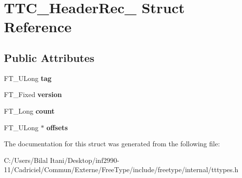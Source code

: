 \hypertarget{struct_t_t_c___header_rec__}{}\section{T\+T\+C\+\_\+\+Header\+Rec\+\_\+ Struct Reference}
\label{struct_t_t_c___header_rec__}
\subsection*{Public Attributes}
\begin{DoxyCompactItemize}
\item 
F\+T\+\_\+\+U\+Long {\bfseries tag}\hypertarget{struct_t_t_c___header_rec___a7fc09906e402f8937b6ca207c84453b4}{}\label{struct_t_t_c___header_rec___a7fc09906e402f8937b6ca207c84453b4}

\item 
F\+T\+\_\+\+Fixed {\bfseries version}\hypertarget{struct_t_t_c___header_rec___aa9ecb33279c68c3c00c1232441da5801}{}\label{struct_t_t_c___header_rec___aa9ecb33279c68c3c00c1232441da5801}

\item 
F\+T\+\_\+\+Long {\bfseries count}\hypertarget{struct_t_t_c___header_rec___a0bf5898e9d8c55bc74f51712a5ad1b58}{}\label{struct_t_t_c___header_rec___a0bf5898e9d8c55bc74f51712a5ad1b58}

\item 
F\+T\+\_\+\+U\+Long $\ast$ {\bfseries offsets}\hypertarget{struct_t_t_c___header_rec___a2ab33f787e8085d7086968fb931060b5}{}\label{struct_t_t_c___header_rec___a2ab33f787e8085d7086968fb931060b5}

\end{DoxyCompactItemize}


The documentation for this struct was generated from the following file\+:\begin{DoxyCompactItemize}
\item 
C\+:/\+Users/\+Bilal Itani/\+Desktop/inf2990-\/11/\+Cadriciel/\+Commun/\+Externe/\+Free\+Type/include/freetype/internal/tttypes.\+h\end{DoxyCompactItemize}
